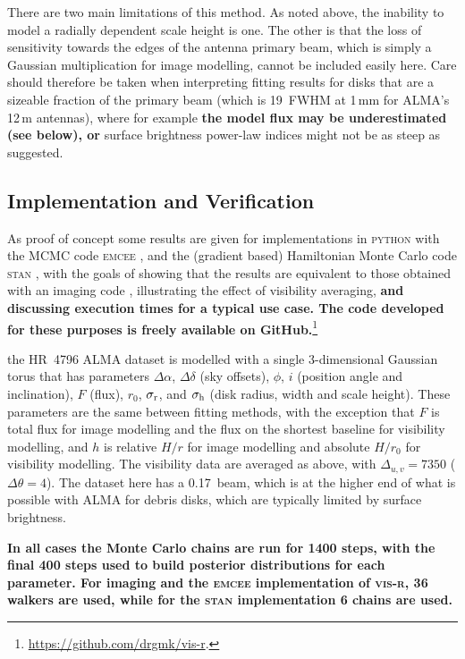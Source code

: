 \documentclass[fleqn,usenatbib]{mnras}
\begin{document}
There are two main limitations of this method. As noted above, the inability to model a radially dependent scale height is one. The other is that the loss of sensitivity towards the edges of the antenna primary beam, which is simply a Gaussian multiplication for image modelling, cannot be included easily here. Care should therefore be taken when interpreting fitting results for disks that are a sizeable fraction of the primary beam (which is 19\arcsec~FWHM at 1\,mm for ALMA's 12\,m antennas), where for example \textbf{the model flux may be underestimated (see below), or} surface brightness power-law indices might not be as steep as suggested.

\subsection{ Implementation and Verification}

As proof of concept some results are given for implementations in \textsc{python} with the MCMC code \textsc{emcee} \citep{2013PASP..125..306F}, and the (gradient based) Hamiltonian Monte Carlo code \textsc{stan} \citep{2017JSS....76....1C}, with the goals of showing that the results are equivalent to those obtained with an imaging code \citep[e.g.][]{2021MNRAS.504.4497C}, illustrating the effect of visibility averaging, \textbf{and discussing execution times for a typical use case. The code developed for these purposes is freely available on GitHub.}\footnote{\href{https://github.com/drgmk/vis-r}{https://github.com/drgmk/vis-r}.}

 the HR~4796 ALMA dataset is modelled with a single 3-dimensional Gaussian torus that has parameters $\Delta \alpha$, $\Delta \delta$ (sky offsets), $\phi$, $i$ (position angle and inclination), $F$ (flux), $r_0$, $\sigma_{\rm r}$, and $\sigma_{\rm h}$ (disk radius, width and scale height). These parameters are the same between fitting methods, with the exception that $F$ is total flux for image modelling and the flux on the shortest baseline for visibility modelling, and $h$ is relative $H/r$ for image modelling and absolute $H/r_0$ for visibility modelling. The visibility data are averaged as above, with $\Delta_{u,v} = 7350$ ($\Delta \theta = 4$). The dataset here has a 0.17\arcsec~beam, which is at the higher end of what is possible with ALMA for debris disks, which are typically limited by surface brightness.

\textbf{In all cases the Monte Carlo chains are run for 1400 steps, with the final 400 steps used to build posterior distributions for each parameter. For imaging and the \textsc{emcee} implementation of \textsc{vis-r}, 36 walkers are used, while for the \textsc{stan} implementation 6 chains are used.}
\end{document}
